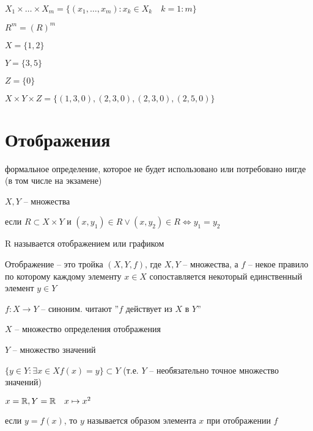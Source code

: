         \begin{definition}

            $X_1\times \ldots\times X_m = \{(x_1, \ldots, x_{m} ):x_k\in X_k\quad k = 1:m\}$

            $R^m = (R)^m$
        \end{definition}

        \begin{example}
            $X = \{1,2\}$

            $Y = \{3,5\}$

            $Z = \{0\}$

            $X\times Y\times Z = \{(1,3,0),(2,3,0),(2,3,0),(2,5,0)\}$
        \end{example}

        \section{Отображения}
        формальное определение, которое не будет использовано или потребовано нигде (в том числе на экзамене)
        \begin{definition}
           $X,Y$ -- множества

           если $R\subset X\times Y$ и $(x,y_1)\in R \vee (x,y_2)\in R \iff y_1=y_2$



    R называется отображением или графиком
    \end{definition}
    
        

    \begin{definition}
            Отображение -- это тройка $(X,Y,f)$, где $X,Y$ -- множества, а $f$ -- некое правило по которому каждому элементу $x\in X$ сопоставляется некоторый единственный элемент $y\in Y$
            
            $f:X\to Y$ -- синоним. читают ''$f$ действует из $X$ в $Y$''

            $X$ -- множество определения отображения

            $Y$ -- множество значений

            $\{y\in Y: \exists x\in X f(x) = y\}\subset Y$ (т.е. $Y$ -- необязательно точное множество значений)
    \end{definition}
    
    \begin{example}
        $x = \mathbb{R}, Y = \mathbb{R} \quad x\mapsto x^2$

        если $y=f(x)$, то $y$ называется образом элемента $x$ при отображении $f$
    \end{example}

